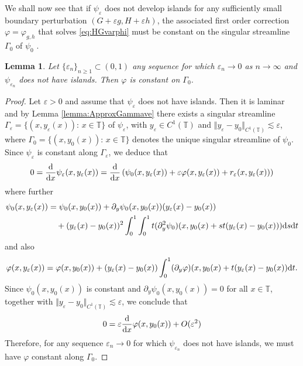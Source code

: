 \documentclass[11pt,reqno]{amsproc}
\newcommand{\ve}{\varepsilon}
\newcommand{\rmd}{{\rm d}}
\numberwithin{equation}{section}
\numberwithin{theorem}{section}
\numberwithin{prop}{section}
\numberwithin{cor}{section}
\newtheorem{lemma}{Lemma}
\numberwithin{lemma}{section}
\theoremstyle{remark}
\theoremstyle{definition}
\begin{document}
We shall now see that if $\psi_\ve$ does not develop islands for any sufficiently small boundary perturbation $(G+\ve g,H+\ve h)$, the associated first order correction $\varphi=\varphi_{g,h}$ that solves \eqref{eq:HGvarphi} must be constant on the singular streamline $\Gamma_0$ of $\psi_0$ .

\begin{lemma}\label{lemma:laminarcontradiction}
Let $\lbrace \ve_n \rbrace_{n\geq 1}\subset (0,1)$ any sequence for which $\ve_n\rightarrow 0$ as $n\rightarrow \infty$ and $\psi_{\ve_n}$ does not have islands. Then $\varphi$ is constant on $\Gamma_0$.
\end{lemma}

\begin{proof}
Let $\ve>0$ and assume that $\psi_\ve$ does not have islands. Then it is laminar and by Lemma \ref{lemma:ApproxGammave} there exists a singular streamline $\Gamma_\ve= \lbrace (x,y_\ve(x)): \, x\in \mathbb{T} \rbrace$ of $\psi_\ve$, with $y_\ve\in C^1(\mathbb{T})$ and $\Vert y_\ve - y_0 \Vert_{C^1(\mathbb{T})}\lesssim \ve$, where $\Gamma_0= \lbrace (x,y_0(x)): \, x\in \mathbb{T} \rbrace$ denotes the unique singular streamline of $\psi_0$. Since $\psi_\ve$ is constant along $\Gamma_\ve$, we deduce that
\begin{align*}
0 = \frac{\rmd}{\rmd x}\psi_\ve(x,y_\ve(x)) = \frac{\rmd }{\rmd x} \left( \psi_0(x,y_\ve(x)) + \ve\varphi(x,y_\ve(x)) + r_\ve(x,y_\ve(x)) \right)
\end{align*}
where further
\begin{align*}
\psi_0(x,y_\ve(x)) &= \psi_0(x,y_0(x)) + \partial_y\psi_0(x,y_0(x))(y_\ve(x)-y_0(x)) \\
&\quad+ (y_\ve(x) - y_0(x) )^2 \int_0^1 \int_0^1 t(\partial_y^2\psi_0)(x,y_0(x) + st(y_\ve(x) - y_0(x))) \rmd s \rmd t
\end{align*}
and also
\begin{align*}
\varphi(x,y_\ve(x)) = \varphi(x,y_0(x)) + (y_\ve(x) - y_0(x))\int_0 ^1 (\partial_y\varphi)(x, y_0(x) + t(y_\ve(x) - y_0(x)) \rmd t.
\end{align*}
Since $\psi_0(x,y_0(x))$ is constant and $\partial_y\psi_0(x,y_0(x)) = 0$ for all $x\in \mathbb{T}$, together with $\Vert y_\ve -y_0 \Vert_{C^1(\mathbb{T})} \lesssim \ve$, we conclude that
\begin{align*}
0 = \ve \frac{\rmd }{\rmd x}\varphi(x,y_0(x)) + O(\ve^2)
\end{align*}
Therefore, for any sequence $\ve_n\rightarrow 0$ for which $\psi_{\ve_n}$ does not have islands, we must have $\varphi$ constant along $\Gamma_0$.
\end{proof}
\end{document}
